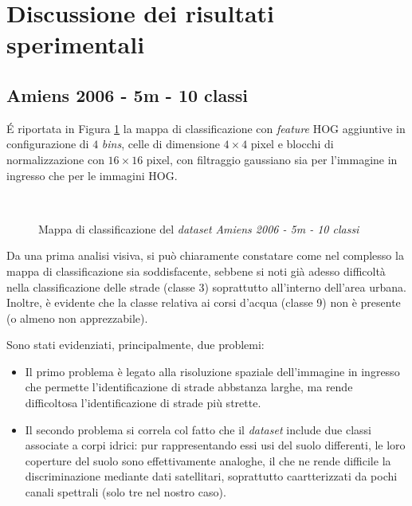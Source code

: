 \clearpage

\section{Discussione dei risultati sperimentali}

\subsection{Amiens 2006 - 5m - 10 classi}

\'E riportata in Figura \ref{fig:ClassMap_Amiens2006_5m} la mappa di
classificazione con \emph{feature} HOG aggiuntive in configurazione di
$4$ \emph{bins}, celle di dimensione $4\times4$ pixel e blocchi di
normalizzazione con $16\times16$ pixel, con filtraggio gaussiano sia
per l'immagine in ingresso che per le immagini HOG.

\begin{figure}[!ht]
\center
{}
\\

\caption{Mappa di classificazione del \emph{dataset} \emph{Amiens 2006 - 5m - 10 classi}}

\label{fig:ClassMap_Amiens2006_5m}

\end{figure}
\clearpage
Da una prima analisi visiva, si può chiaramente constatare come nel
complesso la mappa di classificazione sia soddisfacente, sebbene si
noti già adesso difficoltà nella classificazione delle strade (classe
3) soprattutto all'interno dell'area urbana. Inoltre, è evidente che
la classe relativa ai corsi d'acqua (classe 9) non è presente (o
almeno non apprezzabile).

Sono stati evidenziati, principalmente, due problemi:
\begin{itemize}
\item Il primo problema è legato alla risoluzione spaziale dell'immagine in
ingresso che permette l'identificazione di strade abbstanza larghe, ma
rende difficoltosa l'identificazione di strade più strette.
\item Il secondo problema si correla col fatto che il \emph{dataset} include due classi
associate a corpi idrici: pur rappresentando essi usi del suolo
differenti, le loro coperture del suolo sono effettivamente analoghe,
il che ne rende difficile la discriminazione mediante dati
satellitari, soprattutto caartterizzati da pochi canali spettrali
(solo tre nel nostro caso).
\end{itemize}

